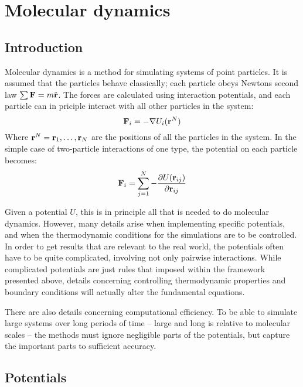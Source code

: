 \chapter{Molecular dynamics}

\section{Introduction}
Molecular dynamics is a method for simulating systems of point particles. It is assumed that the particles behave classically; each particle obeys Newtons second law $\sum \mathbf{F} = m\ddot{\mathbf{r}}$. The forces are calculated using interaction potentials, and each particle can in priciple interact with all other particles in the system:
\begin{equation}
	\mathbf{F}_i = -\nabla U_i(\mathbf{r}^N)
\end{equation}
Where $\mathbf{r}^N = \mathbf{r}_1, \dots, \mathbf{r}_N$ are the positions of all the particles in the system. In the simple case of two-particle interactions of one type, the potential on each particle becomes:
\begin{equation}
	\mathbf{F}_i = \sum_{j=1}^N -\frac{\partial U(\mathbf{r}_{ij})}{\partial \mathbf{r}_{ij}}
\end{equation}

Given a potential $U$, this is in principle all that is needed to do molecular dynamics. However, many details arise when implementing specific potentials, and when the thermodynamic conditions for the simulations are to be controlled. In order to get results that are relevant to the real world, the potentials often have to be quite complicated, involving not only pairwise interactions. While complicated potentials are just rules that imposed within the framework presented above, details concerning controlling thermodynamic properties and boundary conditions will actually alter the fundamental equations. 

There are also details concerning computational efficiency. To be able to simulate large systems over long periods of time -- large and long is relative to molecular scales -- the methods must ignore negligible parts of the potentials, but capture the important parts to sufficient accuracy.

\section{Potentials}

